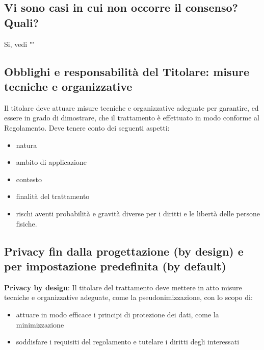 \subsection{Vi sono casi in cui non occorre il consenso? Quali?}
Si, vedi ""

\subsection{Obblighi e responsabilità del Titolare: misure tecniche e organizzative}

Il titolare deve attuare misure tecniche e organizzative adeguate per
garantire, ed essere in grado di dimostrare, che il trattamento è effettuato in
modo conforme al Regolamento.
Deve tenere conto dei seguenti aspetti:
\begin{itemize}
    \item natura
    \item ambito di applicazione
    \item contesto
    \item finalità del trattamento
    \item rischi aventi probabilità e gravità diverse per i diritti e le libertà delle persone fisiche.
\end{itemize}

\subsection{Privacy fin dalla progettazione (by design) e per impostazione predefinita (by default)}

\textbf{Privacy by design}:
\newline
Il titolare del trattamento deve mettere in atto misure tecniche e
organizzative adeguate, come la pseudonimizzazione, con lo scopo di:
\begin{itemize}
    \item attuare in modo efficace i principi di protezione dei dati, come la minimizzazione
    \item soddisfare i requisiti del regolamento e tutelare i diritti degli interessati
\end{itemize}

